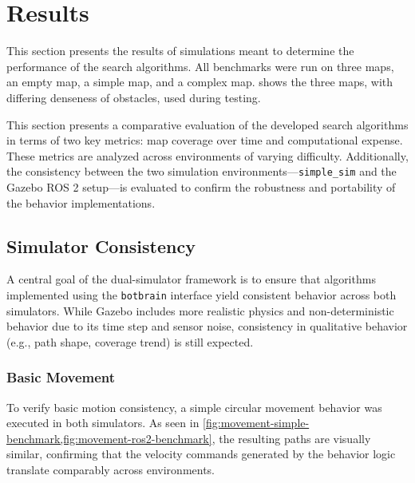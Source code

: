 \section{Results}
\label{sec:results}
This section presents the results of simulations meant to determine the performance of the search algorithms. All benchmarks were run on three maps, an empty map, a simple map, and a complex map.  shows the three maps, with differing denseness of obstacles, used during testing.

This section presents a comparative evaluation of the developed search algorithms in terms of two key metrics: map coverage over time and computational expense. These metrics are analyzed across environments of varying difficulty. 
Additionally, the consistency between the two simulation environments—\texttt{simple\_sim} and the Gazebo ROS 2 setup—is evaluated to confirm the robustness and portability of the behavior implementations.
%



\subsection{Simulator Consistency}
A central goal of the dual-simulator framework is to ensure that algorithms implemented using the \texttt{botbrain} interface yield consistent behavior across both simulators. While Gazebo includes more realistic physics and non-deterministic behavior due to its time step and sensor noise, consistency in qualitative behavior (e.g., path shape, coverage trend) is still expected.


\subsubsection{Basic Movement}
To verify basic motion consistency, a simple circular movement behavior was executed in both simulators. As seen in \cref{fig:movement-simple-benchmark,fig:movement-ros2-benchmark}, the resulting paths are visually similar, confirming that the velocity commands generated by the behavior logic translate comparably across environments.


